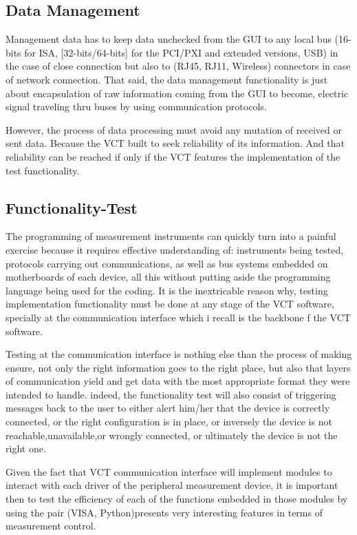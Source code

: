 \documentclass [10pt]{article}
\begin{document}
\subsection{Data Management}
Management data has to keep data unchecked from the GUI to any local bus (16-bits for ISA, [32-bits/64-bits] for the PCI/PXI and extended versions, USB) in the case of  close connection but also to (RJ45, RJ11, Wireless) connectors in case of network connection. That said, the data management functionality is just about encapsulation of raw information coming from the GUI to become, electric signal traveling thru buses by using communication protocols.\par
However, the process of data processing must avoid any mutation of received or sent data. Because the VCT built to seek reliability of its information. And that reliability can be reached if only if the VCT features the implementation of the test functionality.

 \newpage
\subsection{ Functionality-Test}  
 
The programming of measurement instruments can quickly turn into a painful exercise because it requires effective understanding of: instruments being tested, protocols carrying out communications, as well as bus systems embedded on motherboards of each device, all this without putting aside the programming language  being used for the coding. It is the inextricable reason why, testing implementation functionality must be done at any stage of the VCT software, specially at the communication interface which i recall is the backbone f the VCT software.\par
Testing at the communication interface is nothing else than the process of making ensure, not only the right information goes to the right place, but also that layers of communication yield and get data with the most appropriate format they were intended to handle.
indeed, the functionality test will also consist of triggering messages back to the user to either alert him/her that the device is correctly connected, or the right configuration is in place, or inversely the device is not reachable,unavailable,or wrongly connected, or ultimately the device is not the right one.\par
Given the fact that VCT communication interface  will implement  modules to interact with each driver of the peripheral measurement device, it is important then to test the efficiency of each of the functions embedded in those modules by using the pair (VISA, Python)presents very interesting  features in terms of   measurement control. 
\end{document}
